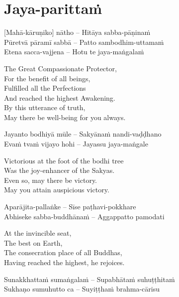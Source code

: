 \section{Jaya-parittaṁ}
\label{jaya-parittam}

\vspace{-1em}

[Mahā-kāruṇiko] nātho – Hitāya sabba-pāṇinaṁ\\
Pūretvā pāramī sabbā – Patto sambodhim-uttamaṁ\\
Etena sacca-vajjena – Hotu te jaya-maṅgalaṁ

\begin{english-verses}
  The Great Compassionate Protector,\\
  For the benefit of all beings,\\
  Fulfilled all the Perfections\\
  And reached the highest Awakening.\\
  By this utterance of truth,\\
  May there be well-being for you always.
\end{english-verses}

Jayanto bodhiyā mūle – Sakyānaṁ nandi-vaḍḍhano\\
Evaṁ tvaṁ vijayo hohi – Jayassu jaya-maṅgale

\begin{english-verses}
  Victorious at the foot of the bodhi tree\\
  Was the joy-enhancer of the Sakyas.\\
  Even so, may there be victory.\\
  May you attain auspicious victory.
\end{english-verses}

Aparājita-pallaṅke – Sīse paṭhavi-pokkhare\\
Abhiseke sabba-buddhānaṁ – Aggappatto pamodati

\begin{english-verses}
  At the invincible seat,\\
  The best on Earth,\\
  The consecration place of all Buddhas,\\
  Having reached the highest, he rejoices.
\end{english-verses}

\suttaRef{[MJG]}

Sunakkhattaṁ sumaṅgalaṁ – Supabhātaṁ suhuṭṭhitaṁ\\
Sukhaṇo sumuhutto ca – Suyiṭṭhaṁ brahma-cārisu

